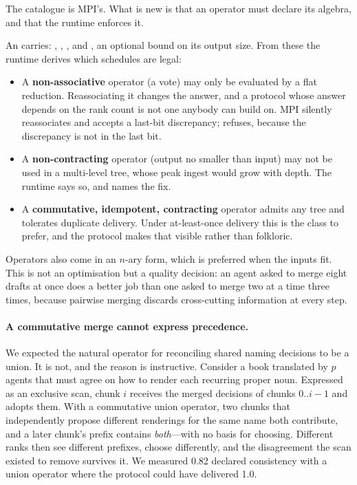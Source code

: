 The catalogue is MPI's. What is new is that an operator must declare its
algebra, and that the runtime enforces it.

An  carries: , , ,
and , an optional bound on its output size. From these
the runtime derives which schedules are legal:

\begin{itemize}
\item A \textbf{non-associative} operator (a vote) may only be evaluated by
a flat reduction. Reassociating it changes the answer, and a protocol whose
answer depends on the rank count is not one anybody can build on. MPI
silently reassociates and accepts a last-bit discrepancy; \ampi{} refuses,
because the discrepancy is not in the last bit.
\item A \textbf{non-contracting} operator (output no smaller than input)
may not be used in a multi-level tree, whose peak ingest would grow with
depth. The runtime says so, and names the fix.
\item A \textbf{commutative, idempotent, contracting} operator admits any
tree and tolerates duplicate delivery. Under at-least-once delivery this is
the class to prefer, and the protocol makes that visible rather than
folkloric.
\end{itemize}

Operators also come in an $n$-ary form, which is preferred when the inputs
fit. This is not an optimisation but a quality decision: an agent asked to
merge eight drafts at once does a better job than one asked to merge two at
a time three times, because pairwise merging discards cross-cutting
information at every step.

\paragraph{A commutative merge cannot express precedence.}
We expected the natural operator for reconciling shared naming decisions to
be a union. It is not, and the reason is instructive. Consider a book
translated by $p$ agents that must agree on how to render each recurring
proper noun. Expressed as an exclusive scan, chunk $i$ receives the merged
decisions of chunks $0..i-1$ and adopts them. With a commutative union
operator, two chunks that independently propose different renderings for the
same name both contribute, and a later chunk's prefix contains
\emph{both}---with no basis for choosing. Different ranks then see different
prefixes, choose differently, and the disagreement the scan existed to
remove survives it. We measured 0.82 declared consistency with a union
operator where the protocol could have delivered 1.0.

